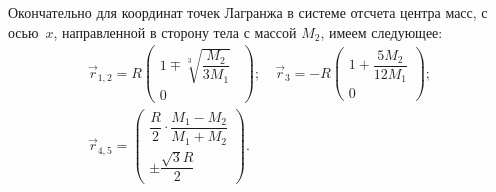 Окончательно для координат точек Лагранжа в системе отсчета центра масс, с осью~$x$, направленной в сторону тела с массой $M_2$, имеем следующее:
\begin{equation}
	\begin{gathered}
        \vec{r}_{1,2} = R \begin{pmatrix}
            1 \mp \sqrt[3]{\dfrac{M_2}{3M_1}}~~\\[1pc]
            0
        \end{pmatrix}; \quad
        \vec{r}_3 = - R \begin{pmatrix}
            1 + \dfrac{5 M_2}{12 M_1}\\[1pc]
            0
        \end{pmatrix};\\[0.5pc]
        \vec{r}_{4,5} = \begin{pmatrix}
            \dfrac{R}{2} \cdot \dfrac{M_1-M_2}{M_1+M_2}\\[1pc]
            \pm \dfrac{\sqrt{3}R}{2}
        \end{pmatrix}.
    \end{gathered}
\end{equation}

{\footnotesize }

